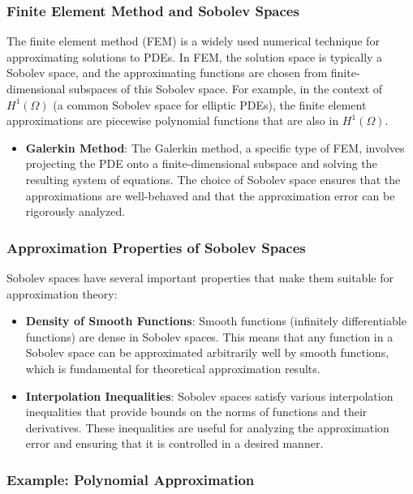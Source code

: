 \documentclass[11pt,a4paper]{article}
\begin{document}
\subsubsection{Finite Element Method and Sobolev Spaces}

The finite element method (FEM) is a widely used numerical technique for approximating solutions to PDEs. In FEM, the solution space is typically a Sobolev space, and the approximating functions are chosen from finite-dimensional subspaces of this Sobolev space. For example, in the context of \(H^1(\Omega)\) (a common Sobolev space for elliptic PDEs), the finite element approximations are piecewise polynomial functions that are also in \(H^1(\Omega)\).

\begin{itemize}
    \item \textbf{Galerkin Method}: The Galerkin method, a specific type of FEM, involves projecting the PDE onto a finite-dimensional subspace and solving the resulting system of equations. The choice of Sobolev space ensures that the approximations are well-behaved and that the approximation error can be rigorously analyzed.
\end{itemize}

\subsubsection{Approximation Properties of Sobolev Spaces}

Sobolev spaces have several important properties that make them suitable for approximation theory:

\begin{itemize}
    \item \textbf{Density of Smooth Functions}: Smooth functions (infinitely differentiable functions) are dense in Sobolev spaces. This means that any function in a Sobolev space can be approximated arbitrarily well by smooth functions, which is fundamental for theoretical approximation results.

    \item \textbf{Interpolation Inequalities}: Sobolev spaces satisfy various interpolation inequalities that provide bounds on the norms of functions and their derivatives. These inequalities are useful for analyzing the approximation error and ensuring that it is controlled in a desired manner.
\end{itemize}

\subsubsection{Example: Polynomial Approximation}
\end{document}
